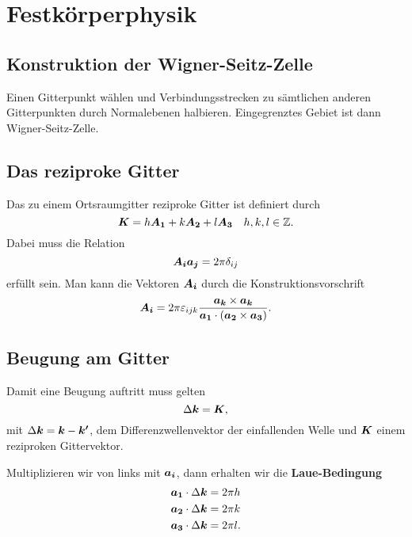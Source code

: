 \chapter{Festkörperphysik}

\section{Konstruktion der Wigner-Seitz-Zelle}
Einen Gitterpunkt wählen und Verbindungsstrecken zu sämtlichen anderen Gitterpunkten durch Normalebenen halbieren.
Eingegrenztes Gebiet ist dann Wigner-Seitz-Zelle.

\section{Das reziproke Gitter}
Das zu einem Ortsraumgitter reziproke Gitter ist definiert durch
\begin{equation*}
	\boldsymbol{K} = h\boldsymbol{A_1} + k\boldsymbol{A_2} + l\boldsymbol{A_3}\quad h,k,l\in\mathbb{Z}.
\end{equation*}
Dabei muss die Relation
\begin{equation*}
	\boldsymbol{A_i}\boldsymbol{a_j} = 2\pi\delta_{ij}
\end{equation*}
erfüllt sein.
Man kann die Vektoren $\boldsymbol{A_i}$ durch die Konstruktionsvorschrift
\begin{equation*}
	\boldsymbol{A_i} = 2\pi\varepsilon_{ijk}\frac{\boldsymbol{a_k}\times\boldsymbol{a_k}}{\boldsymbol{a_1}\cdot(\boldsymbol{a_2}\times\boldsymbol{a_3})}.
\end{equation*}

\section{Beugung am Gitter}
Damit eine Beugung auftritt muss gelten
\begin{equation*}
	\Delta\boldsymbol{k} = \boldsymbol{K},
\end{equation*}
mit $\Delta\boldsymbol{k}=\boldsymbol{k}-\boldsymbol{k'}$, dem Differenzwellenvektor der einfallenden Welle und $\boldsymbol{K}$ einem reziproken Gittervektor.

Multiplizieren wir von links mit $\boldsymbol{a_i}$, dann erhalten wir die \textbf{Laue-Bedingung}
\begin{align*}
	\boldsymbol{a_1}\cdot\Delta\boldsymbol{k} &= 2\pi h \\
	\boldsymbol{a_2}\cdot\Delta\boldsymbol{k} &= 2\pi k \\
	\boldsymbol{a_3}\cdot\Delta\boldsymbol{k} &= 2\pi l.
\end{align*}

